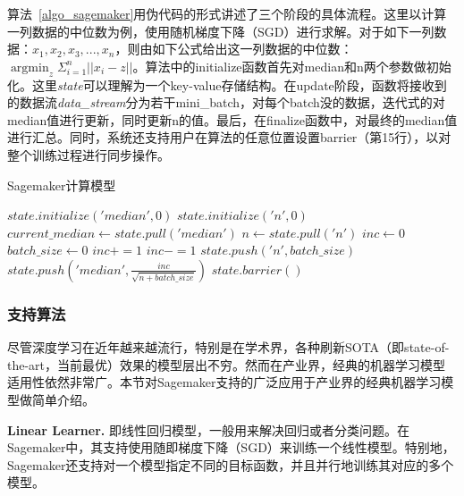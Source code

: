算法~\ref{algo_sagemaker}用伪代码的形式讲述了三个阶段的具体流程。这里以计算一列数据的中位数为例，使用随机梯度下降（SGD）进行求解。对于如下一列数据：$x_1, x_2, x_3, ..., x_n$，则由如下公式给出这一列数据的中位数：$\operatorname{argmin}_z\Sigma_{i=1}^n||x_i-z||$。算法中的initialize函数首先对median和n两个参数做初始化。这里\textit{state}可以理解为一个key-value存储结构。在update阶段，函数将接收到的数据流\textit{data\_stream}分为若干mini\_batch，对每个batch没的数据，迭代式的对median值进行更新，同时更新n的值。最后，在finalize函数中，对最终的median值进行汇总。同时，系统还支持用户在算法的任意位置设置barrier（第15行），以对整个训练过程进行同步操作。

\begin{algorithm}
    \caption{Sagemaker计算模型}
    \label{algo_sagemaker}
    \begin{algorithmic}[1] 
        \State $state.initialize('median', 0)$
        \State $state.initialize('n', 0)$
        \EndFunction
        \State
        \State $current\_median \gets state.pull('median')$
        \State $n \gets state.pull('n')$
        \State $inc \gets 0$
        \State $batch\_size \gets 0$
        \State $inc += 1$
        \Else
        \State $inc -= 1$
        \EndIf
        \EndFor
        \State $state.push('n', batch\_size)$
        \State $state.push('median',\frac{inc}{\sqrt{n + batch\_size}})$
        \State $state.barrier()$
        \EndIf
        \EndFor
        \EndFunction
        \State
        \State {}
        \EndFunction
    \end{algorithmic}
\end{algorithm}

\subsubsection{支持算法}
尽管深度学习在近年越来越流行，特别是在学术界，各种刷新SOTA（即state-of-the-art，当前最优）效果的模型层出不穷。然而在产业界，经典的机器学习模型适用性依然非常广。本节对Sagemaker支持的广泛应用于产业界的经典机器学习模型做简单介绍。

\textbf{Linear Learner. }即线性回归模型，一般用来解决回归或者分类问题。在Sagemaker中，其支持使用随即梯度下降（SGD）来训练一个线性模型。特别地，Sagemaker还支持对一个模型指定不同的目标函数，并且并行地训练其对应的多个模型。

